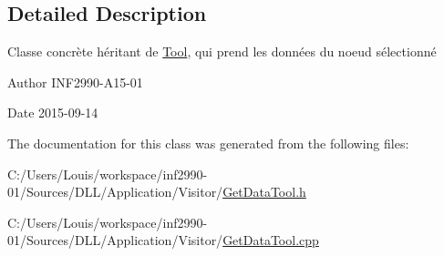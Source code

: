 \subsection{Detailed Description}
Classe concrète héritant de \hyperlink{class_tool}{Tool}, qui prend les données du noeud sélectionné 

\begin{DoxyAuthor}{Author}
I\+N\+F2990-\/\+A15-\/01 
\end{DoxyAuthor}
\begin{DoxyDate}{Date}
2015-\/09-\/14 
\end{DoxyDate}


The documentation for this class was generated from the following files\+:\begin{DoxyCompactItemize}
\item 
C\+:/\+Users/\+Louis/workspace/inf2990-\/01/\+Sources/\+D\+L\+L/\+Application/\+Visitor/\hyperlink{_get_data_tool_8h}{Get\+Data\+Tool.\+h}\item 
C\+:/\+Users/\+Louis/workspace/inf2990-\/01/\+Sources/\+D\+L\+L/\+Application/\+Visitor/\hyperlink{_get_data_tool_8cpp}{Get\+Data\+Tool.\+cpp}\end{DoxyCompactItemize}
